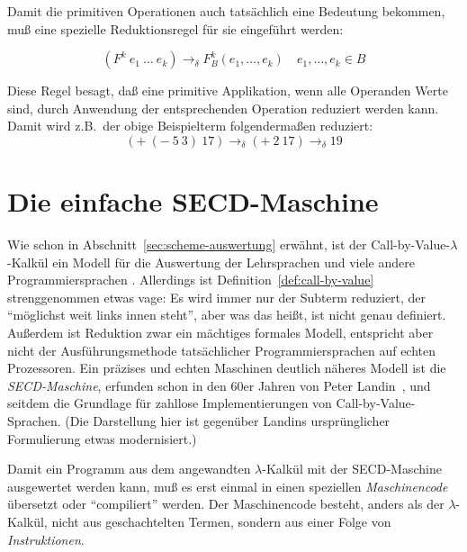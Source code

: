 Damit die primitiven Operationen auch tatsächlich eine Bedeutung
bekommen, muß eine spezielle Reduktionsregel für sie eingeführt
werden:
%
\begin{definition}
\begin{displaymath}
  (F^k~e_1~\ldots~e_k) \rightarrow_{\delta} F_B^k(e_1, \ldots, e_k)
  \quad e_1, \ldots, e_k \in B
\end{displaymath}
\end{definition}
%
Diese Regel besagt, daß eine primitive Applikation, wenn alle
Operanden Werte sind, durch Anwendung der entsprechenden Operation 
reduziert werden kann.  Damit wird z.B.\ der
obige Beispielterm folgendermaßen reduziert:
%
\begin{displaymath}
  (+~(-~5~3)~17) \rightarrow_{\delta} (+~2~17) \rightarrow_{\delta} 19
\end{displaymath}

\section{Die einfache SECD-Maschine}

Wie schon in Abschnitt~\ref{sec:scheme-auswertung} erwähnt, ist 
der Call-by-Value-$\lambda$-Kalkül
ein Modell für die Auswertung der Lehrsprachen und viele andere
Programmiersprachen .
Allerdings ist Definition~\ref{def:call-by-value} strenggenommen etwas
vage: Es wird immer nur der Subterm reduziert, der
"`möglichst weit links innen steht"', aber was das heißt, ist nicht
genau definiert.  Außerdem ist Reduktion zwar ein
mächtiges formales Modell, entspricht aber nicht der
Ausführungsmethode tatsächlicher Programmiersprachen auf echten
Prozessoren.  Ein präzises und echten Maschinen deutlich näheres
Modell ist die \textit{SECD-Maschine}, erfunden
schon in den 60er Jahren von Peter Landin~\cite{Landin1964}, und
seitdem die Grundlage für zahllose Implementierungen von
Call-by-Value-Sprachen.  (Die Darstellung hier ist gegenüber Landins
ursprünglicher Formulierung etwas modernisiert.)

Damit ein Programm aus dem angewandten $\lambda$-Kalkül mit der
SECD-Maschine ausgewertet werden kann, muß es erst einmal in einen
speziellen \textit{Maschinencode} übersetzt oder
"`compiliert"' werden.  Der Maschinencode besteht, anders als der
$\lambda$-Kalkül, nicht aus geschachtelten Termen, sondern aus einer
Folge von \textit{Instruktionen}.  

